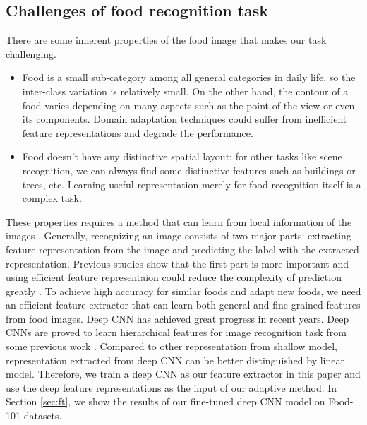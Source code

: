 \subsection{Challenges of food recognition task}
There are some inherent properties of the food image that makes our task challenging.
\begin{itemize}
 \item Food is a small sub-category among all general categories in daily life, so the inter-class variation is relatively small. On the other hand, the contour of a food varies depending on many aspects such as the point of the view or even its components. Domain adaptation techniques could suffer from inefficient feature representations and degrade the performance.
  \item Food doesn't have any distinctive spatial layout: for other tasks like scene recognition, we can always find some distinctive features such as buildings or trees, etc. Learning useful representation merely for food recognition itself is a complex task.
\end{itemize}
These properties requires a method that can learn from local information of the images \cite{bossard2014food}. Generally, recognizing an image consists of two major parts: extracting feature representation from the image and predicting the label with the extracted representation. Previous studies show that the first part is more important and using efficient feature representaion could reduce the complexity of prediction greatly \cite{zeiler2014visualizing} \cite{simonyan2014very}. To achieve high accuracy for similar foods and adapt new foods, we need an efficient feature extractor that can learn both general and fine-grained features from food images. Deep CNN has achieved great progress in recent years. Deep CNNs are proved to learn hierarchical features for image recognition task from some previous work \cite{krizhevsky2012imagenet} \cite{zeiler2010deconvolutional} \cite{CiresanIJCAI11}. Compared to other representation from shallow model, representation extracted from deep CNN can be better distinguished by linear model. Therefore, we train a deep CNN as our feature extractor in this paper and use the deep feature representations as the input of our adaptive method. In Section \ref{sec:ft}, we show the results of our fine-tuned deep CNN model on Food-101 datasets.

